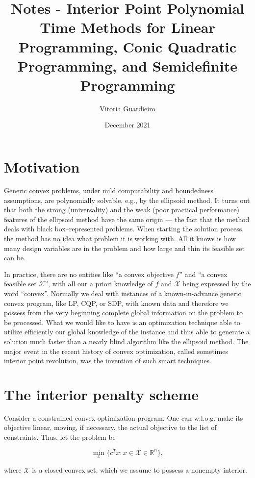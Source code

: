 \documentclass[11pt,a4paper]{article}
\title{Notes - Interior Point Polynomial Time Methods for Linear Programming, Conic Quadratic Programming, and Semidefinite Programming}
\author{Vitoria Guardieiro}
\date{December 2021}
\newcommand{\X}{\mathcal{X}}
\newcommand{\R}{\mathbb{R}}
\begin{document}
\maketitle

\section{Motivation}

Generic convex problems, under mild computability and boundedness assumptions, are polynomially solvable, e.g., by the ellipsoid method. It turns out that both the strong (universality) and the weak (poor practical performance) features of the ellipsoid method have the same origin — the fact that the method deals with black box–represented problems. When starting the solution process, the method has no idea what problem it is working with. All it knows is how many design variables are in the problem and how large and thin its feasible set can be.

In practice, there are no entities like “a convex objective $f$” and “a convex feasible set $\X$”, with all our a priori knowledge of $f$ and $\X$ being expressed by the word “convex”. Normally we deal with instances of a known-in-advance generic convex program, like LP, CQP, or SDP, with known data and therefore we possess from the very beginning complete global information on the problem to be processed. What we would like to have is an optimization technique able to utilize efficiently our global knowledge of the instance and thus able to generate a solution much faster than a nearly blind algorithm like the ellipsoid method. The major event in the recent history of convex optimization, called sometimes interior point revolution, was the invention of such smart techniques.

\section{The interior penalty scheme}

Consider a constrained convex optimization program. One can w.l.o.g. make its objective linear, moving, if necessary, the actual objective to the list of constraints. Thus, let the problem be

\begin{equation}\label{eq:c}
    \underset{x}{\min} \{c^T x : x \in \mathcal{X} \in \R ^n\},\tag{C}
\end{equation}

where $\mathcal{X}$ is a closed convex set, which we assume to possess a nonempty interior.
\end{document}
